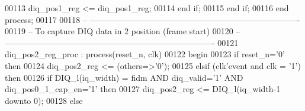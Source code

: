 \begin{DoxyCode}
00113                 \textcolor{vhdlchar}{diq_pos1_reg} \textcolor{vhdlchar}{<=} \textcolor{vhdlchar}{diq_pos1_reg};
00114             \textcolor{keywordflow}{end} \textcolor{keywordflow}{if}; 
00115         \textcolor{keywordflow}{end} \textcolor{keywordflow}{if};
00116     \textcolor{keywordflow}{end} \textcolor{keywordflow}{process};
00117 
00118 \textcolor{keyword}{-- ----------------------------------------------------------------------------}
00119 \textcolor{keyword}{-- To capture DIQ data in 2 position (frame start)}
00120 \textcolor{keyword}{-- ----------------------------------------------------------------------------}
00121  diq\_pos2\_reg\_proc : \textcolor{keywordflow}{process}(reset_n, clk)
00122 \textcolor{vhdlkeyword}{    begin}
00123       \textcolor{keywordflow}{if} \textcolor{vhdlchar}{reset_n}\textcolor{vhdlchar}{=}\textcolor{vhdlchar}{'}\textcolor{vhdllogic}{}\textcolor{vhdllogic}{0}\textcolor{vhdlchar}{'} \textcolor{keywordflow}{then}
00124          \textcolor{vhdlchar}{diq_pos2_reg} \textcolor{vhdlchar}{<=} \textcolor{vhdlchar}{(}\textcolor{keywordflow}{others}\textcolor{vhdlchar}{=}\textcolor{vhdlchar}{>}\textcolor{vhdlchar}{'}\textcolor{vhdllogic}{}\textcolor{vhdllogic}{0}\textcolor{vhdlchar}{'}\textcolor{vhdlchar}{)};
00125       \textcolor{keywordflow}{elsif} \textcolor{vhdlchar}{(}\textcolor{vhdlchar}{clk}\textcolor{vhdlchar}{'}\textcolor{vhdlkeyword}{event} \textcolor{keywordflow}{and} \textcolor{vhdlchar}{clk} \textcolor{vhdlchar}{=} \textcolor{vhdlchar}{'}\textcolor{vhdllogic}{}\textcolor{vhdllogic}{1}\textcolor{vhdlchar}{'}\textcolor{vhdlchar}{)} \textcolor{keywordflow}{then}
00126             \textcolor{keywordflow}{if} \textcolor{vhdlchar}{DIQ_l}\textcolor{vhdlchar}{(}\textcolor{vhdlchar}{iq_width}\textcolor{vhdlchar}{)} \textcolor{vhdlchar}{=} \textcolor{vhdlchar}{fidm} \textcolor{keywordflow}{AND} \textcolor{vhdlchar}{diq_valid}\textcolor{vhdlchar}{=}\textcolor{vhdlchar}{'}\textcolor{vhdllogic}{}\textcolor{vhdllogic}{1}\textcolor{vhdlchar}{'} \textcolor{keywordflow}{AND} \textcolor{vhdlchar}{diq_pos0_1_cap_en}\textcolor{vhdlchar}{=}\textcolor{vhdlchar}{'}\textcolor{vhdllogic}{}\textcolor{vhdllogic}{1}\textcolor{vhdlchar}{'} \textcolor{keywordflow}{then} 
00127             \textcolor{vhdlchar}{diq_pos2_reg} \textcolor{vhdlchar}{<=} \textcolor{vhdlchar}{DIQ_l}\textcolor{vhdlchar}{(}\textcolor{vhdlchar}{iq_width}\textcolor{vhdlchar}{-}\textcolor{vhdllogic}{}\textcolor{vhdllogic}{1} \textcolor{keywordflow}{downto} \textcolor{vhdllogic}{}\textcolor{vhdllogic}{0}\textcolor{vhdlchar}{)};
00128             \textcolor{keywordflow}{else} 

\end{DoxyCode}
